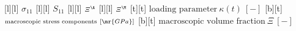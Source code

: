 [l][l]{   ${\scriptstyle \sigma_{11} }$ }
[l][l]{ ${\scriptstyle  S_{11}  }$ }
[l][l]{ ${\scriptstyle \varXi^\A  }$ }
[l][l]{ ${\scriptstyle \varXi^\M  }$ }
[t][t]{ ${\scriptstyle \text{loading parameter}~\kappa(t)~[-]  }$ }
[b][t]{ ${\scriptstyle \text{macroscopic stress components}~[\mr{GPa}]  }$ }
[b][t]{ ${\scriptstyle \text{macroscopic volume fraction}~\varXi~[-]  }$ }
%
%
%
